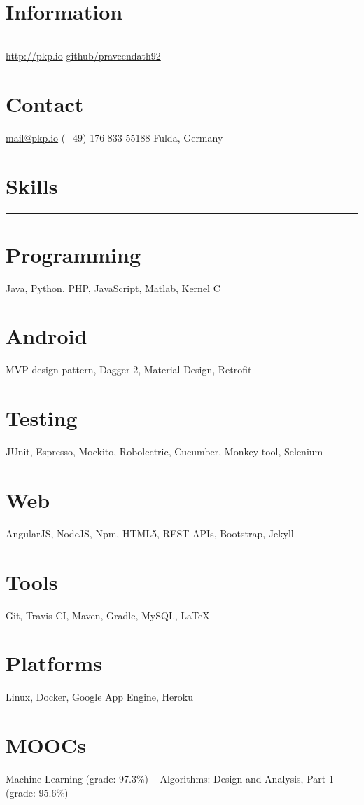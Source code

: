 \documentclass[]{friggeri-cv}
\begin{document}

\begin{aside}
  \section{Information}
    \noindent\rule{3cm}{0.5pt}
    \href{http://pkp.io}{http://pkp.io}
    \href{https://github.com/praveendath92}{github/praveendath92}    
  \section{Contact}
    \href{mailto:mail@pkp.io}{mail@pkp.io}
    (+49) 176-833-55188
    Fulda, Germany
    ~
  \section{Skills}
    \noindent\rule{3cm}{0.5pt}
  \section{Programming}
    Java, Python, PHP, JavaScript, Matlab, Kernel C
  \section{Android}
    MVP design pattern, Dagger 2, Material Design, Retrofit
  \section{Testing}
    JUnit, Espresso, Mockito, Robolectric, Cucumber, Monkey tool, Selenium
  \section{Web}
    AngularJS, NodeJS, Npm, HTML5, REST APIs, Bootstrap, Jekyll
  \section{Tools}
    Git, Travis CI, Maven, Gradle, MySQL, \LaTeX
  \section{Platforms}
    Linux, Docker, Google App Engine, Heroku
  \section{MOOCs}
    Machine Learning (grade: 97.3\%)
    ~
    Algorithms: Design and Analysis, Part 1 (grade: 95.6\%)
\end{aside}
~
\end{document}
